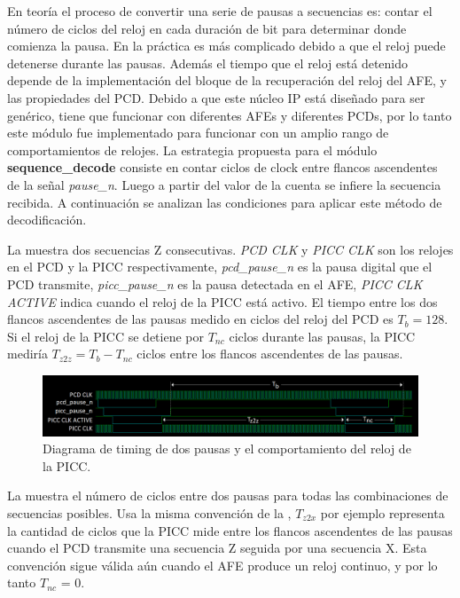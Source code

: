 \documentclass[a4paper, twoside, 11pt]{report}
\begin{document}
En teoría el proceso de convertir una serie de pausas a secuencias es: contar el número de ciclos del reloj en cada duración de bit para determinar donde comienza la pausa. En la práctica es más complicado debido a que el reloj puede detenerse durante las pausas. Además el tiempo que el reloj está detenido depende de la implementación del bloque de la recuperación del reloj del AFE, y las propiedades del PCD. Debido a que este núcleo IP está diseñado para ser genérico, tiene que funcionar con diferentes AFEs y diferentes PCDs, por lo tanto este módulo fue implementado para funcionar con un amplio rango de comportamientos de relojes. La estrategia propuesta para el módulo \textbf{sequence\_decode} consiste en contar ciclos de clock entre flancos ascendentes de la señal \textit{pause\_n}. Luego a partir del valor de la cuenta se infiere la secuencia recibida. A continuación se analizan las condiciones para aplicar este método de decodificación.

La  muestra dos secuencias Z consecutivas. \textit{PCD CLK} y \textit{PICC CLK} son los relojes en el PCD y la PICC respectivamente, \textit{pcd\_pause\_n} es la pausa digital que el PCD transmite, \textit{picc\_pause\_n} es la pausa detectada en el AFE, \textit{PICC CLK ACTIVE} indica cuando el reloj de la PICC está activo. El tiempo entre los dos flancos ascendentes de las pausas medido en ciclos del reloj del PCD es $T_b = 128$. Si el reloj de la PICC se detiene por $T_{nc}$ ciclos durante las pausas, la PICC mediría $T_{z2z} = T_b - T_{nc}$ ciclos entre los flancos ascendentes de las pausas.

\begin{figure}[htb]
  \centering
  \includegraphics[width=1.0\textwidth]{./img/rx_timings_tz2z}
  \caption{Diagrama de timing de dos pausas y el comportamiento del reloj de la PICC.}
  \label{fig:rx_timings_tz2z}
\end{figure}

La  muestra el número de ciclos entre dos pausas para todas las combinaciones de secuencias posibles. Usa la misma convención de la , $T_{z2x}$ por ejemplo representa la cantidad de ciclos que la PICC mide entre los flancos ascendentes de las pausas cuando el PCD transmite una secuencia Z seguida por una secuencia X. Esta convención sigue válida aún cuando el AFE produce un reloj continuo, y por lo tanto $T_{nc}$ = 0.
\end{document}
